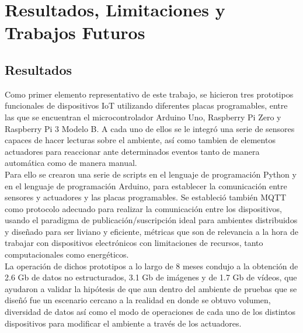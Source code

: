 

\chapter{Resultados, Limitaciones y Trabajos Futuros}

\section{Resultados}
Como primer elemento representativo de este trabajo, se hicieron tres prototipos funcionales de dispositivos IoT utilizando diferentes placas programables, entre las que se encuentran el microcontrolador Arduino Uno, Raspberry Pi Zero y Raspberry Pi 3 Modelo B. A cada uno de ellos se le integró una serie de sensores capaces de hacer lecturas sobre el ambiente, así como tambien de elementos actuadores para reaccionar ante determinados eventos tanto de manera automática como de manera manual.\\

Para ello se crearon una serie de scripts en el lenguaje de programación Python y en el lenguaje de programación Arduino, para establecer la comunicación entre sensores y actuadores y las placas programables.  Se estableció también MQTT como protocolo adecuado para realizar la comunicación entre los dispositivos, usando el paradigma de publicación/suscripción ideal para ambientes distribuidos y diseñado para ser liviano y eficiente, métricas que son de relevancia a la hora de trabajar con dispositivos electrónicos con limitaciones de recursos, tanto computacionales como energéticos.\\

La operación de dichos prototipos a lo largo de 8 meses condujo a la obtención de 2.6 Gb de datos no estructurados, 3.1 Gb de imágenes y de 1.7 Gb de vídeos, que ayudaron a validar la hipótesis de que aun dentro del ambiente de pruebas que se diseñó fue un escenario cercano a la realidad en donde se obtuvo volumen, diversidad de datos así como el modo de operaciones de cada uno de los distintos dispositivos para modificar el ambiente a través de los actuadores.\\


